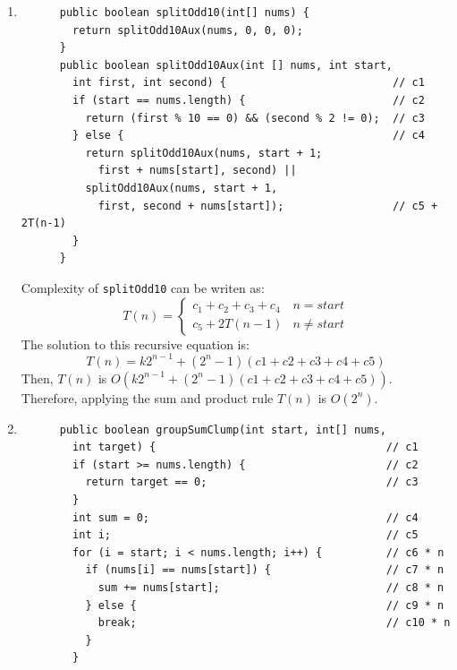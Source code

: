 \documentclass[a4paper,12pt]{article}
\begin{document}
\begin{enumerate}
      \item \begin{Verbatim}
      public boolean splitOdd10(int[] nums) {
        return splitOdd10Aux(nums, 0, 0, 0);
      }
      public boolean splitOdd10Aux(int [] nums, int start,
        int first, int second) {                          // c1
        if (start == nums.length) {                       // c2
          return (first % 10 == 0) && (second % 2 != 0);  // c3
        } else {                                          // c4
          return splitOdd10Aux(nums, start + 1;
            first + nums[start], second) ||
          splitOdd10Aux(nums, start + 1,
            first, second + nums[start]);                 // c5 + 2T(n-1)
        }
      }
      \end{Verbatim}
      Complexity of \texttt{splitOdd10} can be writen as:
      \begin{equation*}
        T\left(n\right)=\left\{\begin{array}{cc}c_1+c_2+c_3+c_4&n=start\\c_5+2T\left(n-1\right)&n\neq start\end{array}\right.
      \end{equation*}
      The solution to this recursive equation is:
      \begin{equation*}
        T\left( n \right)=k2^{n-1} + \left( 2^{n} - 1 \right) \left( c1 + c2 + c3 + c4 + c5 \right)
      \end{equation*}
      Then, $T\left(n\right)$ is $O\left(k2^{n-1} + \left( 2^{n} - 1 \right) \left( c1 + c2 + c3 + c4 + c5 \right)\right)$.\\
      Therefore, applying the sum and product rule $T(n)$ is $O(2^n)$.
      \item \begin{Verbatim}
      public boolean groupSumClump(int start, int[] nums,
        int target) {                                    // c1
        if (start >= nums.length) {                      // c2
          return target == 0;                            // c3
        }
        int sum = 0;                                     // c4
        int i;                                           // c5
        for (i = start; i < nums.length; i++) {          // c6 * n
          if (nums[i] == nums[start]) {                  // c7 * n
            sum += nums[start];                          // c8 * n
          } else {                                       // c9 * n
            break;                                       // c10 * n
          }
        }

\end{Verbatim}
\end{enumerate}
\end{document}
